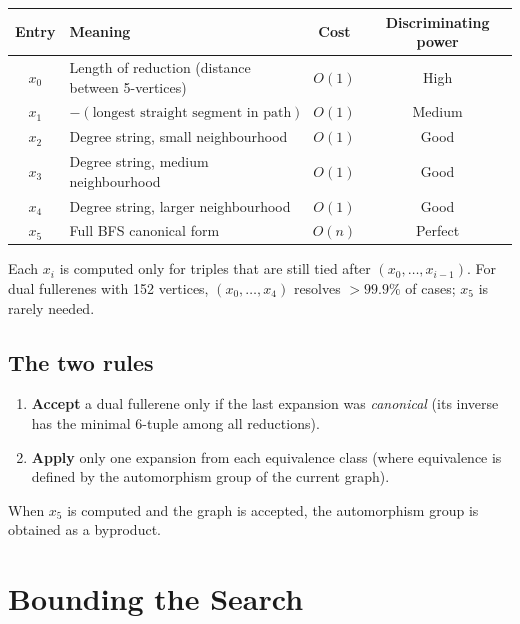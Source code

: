 \documentclass[11pt,a4paper]{article}
\theoremstyle{definition}
\begin{document}
\begin{center}
\begin{tabular}{clcc}
Entry & Meaning & Cost & Discriminating power \\
\hline
$x_0$ & Length of reduction (distance between 5-vertices) & $O(1)$ & High \\
$x_1$ & $-(\text{longest straight segment in path})$ & $O(1)$ & Medium \\
$x_2$ & Degree string, small neighbourhood & $O(1)$ & Good \\
$x_3$ & Degree string, medium neighbourhood & $O(1)$ & Good \\
$x_4$ & Degree string, larger neighbourhood & $O(1)$ & Good \\
$x_5$ & Full BFS canonical form & $O(n)$ & Perfect \\
\end{tabular}
\end{center}

Each $x_i$ is computed only for triples that are still tied after
$(x_0, \ldots, x_{i-1})$.  For dual fullerenes with 152 vertices,
$(x_0, \ldots, x_4)$ resolves $> 99.9\%$ of cases; $x_5$ is rarely
needed.

\subsection{The two rules}

\begin{enumerate}[nosep]
  \item \textbf{Accept} a dual fullerene only if the last expansion was
    \emph{canonical} (its inverse has the minimal 6-tuple among all
    reductions).
  \item \textbf{Apply} only one expansion from each equivalence class
    (where equivalence is defined by the automorphism group of the
    current graph).
\end{enumerate}

When $x_5$ is computed and the graph is accepted, the automorphism
group is obtained as a byproduct.

\section{Bounding the Search}\label{sec:bounds}
\end{document}
